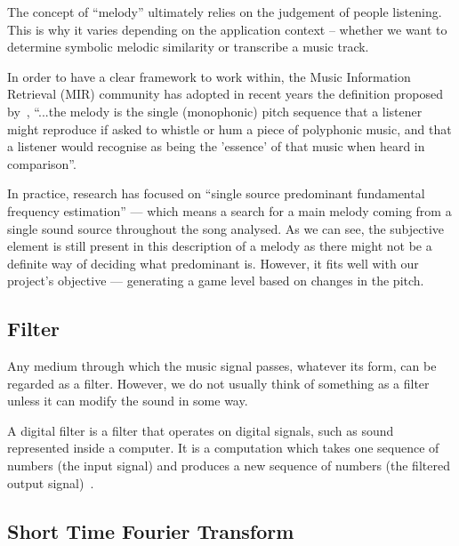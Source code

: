 The concept of “melody” ultimately relies on the judgement of people listening. This is why it varies depending on the application context -- whether we want to determine symbolic melodic similarity or transcribe a music track. 

In order to have a clear framework to work within, the Music Information Retrieval (MIR) community has adopted in recent years the definition proposed by~\cite{melodydef}, ``...the melody is the single (monophonic) pitch sequence that a listener might reproduce if asked to whistle or hum a piece of polyphonic music, and that a listener would recognise as being the 'essence' of that music when heard in comparison''.

In practice, research has focused on ``single source predominant fundamental frequency estimation'' — which means a search for a main melody coming from a single sound source throughout the song analysed. As we can see, the subjective element is still present in this description of a melody as there might not be a definite way of deciding what predominant is. However, it fits well with our project’s objective — generating a game level based on changes in the pitch.

\vspace{10pt}

\subsection{Filter}

Any medium through which the music signal passes, whatever its form, can be regarded as a filter. However, we do not usually think of something as a filter unless it can modify the sound in some way. 

A digital filter is a filter that operates on digital signals, such as sound represented inside a computer. It is a computation which takes one sequence of numbers (the input signal) and produces a new sequence of numbers (the filtered output signal)~\cite{filters}.

\vspace{10pt}

\subsection{Short Time Fourier Transform}

